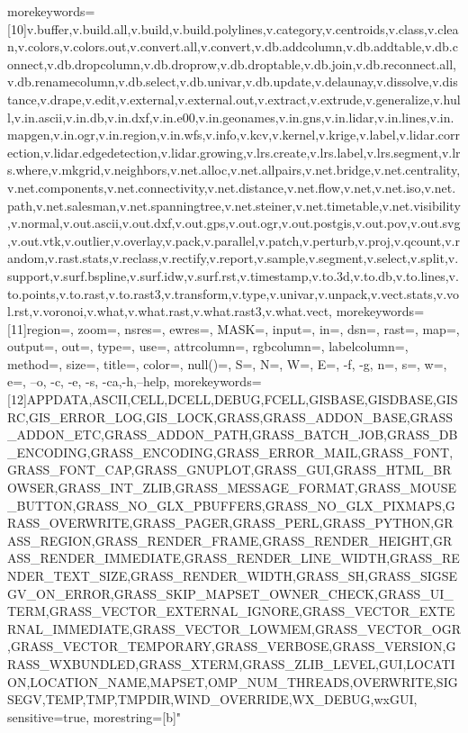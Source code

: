 {%
morekeywords=[10]{v.buffer,v.build.all,v.build,v.build.polylines,v.category,v.centroids,v.class,v.clean,v.colors,v.colors.out,v.convert.all,v.convert,v.db.addcolumn,v.db.addtable,v.db.connect,v.db.dropcolumn,v.db.droprow,v.db.droptable,v.db.join,v.db.reconnect.all,v.db.renamecolumn,v.db.select,v.db.univar,v.db.update,v.delaunay,v.dissolve,v.distance,v.drape,v.edit,v.external,v.external.out,v.extract,v.extrude,v.generalize,v.hull,v.in.ascii,v.in.db,v.in.dxf,v.in.e00,v.in.geonames,v.in.gns,v.in.lidar,v.in.lines,v.in.mapgen,v.in.ogr,v.in.region,v.in.wfs,v.info,v.kcv,v.kernel,v.krige,v.label,v.lidar.correction,v.lidar.edgedetection,v.lidar.growing,v.lrs.create,v.lrs.label,v.lrs.segment,v.lrs.where,v.mkgrid,v.neighbors,v.net.alloc,v.net.allpairs,v.net.bridge,v.net.centrality,v.net.components,v.net.connectivity,v.net.distance,v.net.flow,v.net,v.net.iso,v.net.path,v.net.salesman,v.net.spanningtree,v.net.steiner,v.net.timetable,v.net.visibility,v.normal,v.out.ascii,v.out.dxf,v.out.gps,v.out.ogr,v.out.postgis,v.out.pov,v.out.svg,v.out.vtk,v.outlier,v.overlay,v.pack,v.parallel,v.patch,v.perturb,v.proj,v.qcount,v.random,v.rast.stats,v.reclass,v.rectify,v.report,v.sample,v.segment,v.select,v.split,v.support,v.surf.bspline,v.surf.idw,v.surf.rst,v.timestamp,v.to.3d,v.to.db,v.to.lines,v.to.points,v.to.rast,v.to.rast3,v.transform,v.type,v.univar,v.unpack,v.vect.stats,v.vol.rst,v.voronoi,v.what,v.what.rast,v.what.rast3,v.what.vect},
morekeywords=[11]{region=, zoom=, nsres=, ewres=, MASK=, input=, in=, dsn=, rast=, map=, output=, out=, type=, use=, attrcolumn=, rgbcolumn=, labelcolumn=, method=, size=, title=, color=, null()=, S=, N=, W=, E=, -f, -g, n=, 
s=, w=, e=, --o, -c, -e, -s, -ca,-h,--help},
morekeywords=[12]{APPDATA,ASCII,CELL,DCELL,DEBUG,FCELL,GISBASE,GISDBASE,GISRC,GIS_ERROR_LOG,GIS_LOCK,GRASS,GRASS_ADDON_BASE,GRASS_ADDON_ETC,GRASS_ADDON_PATH,GRASS_BATCH_JOB,GRASS_DB_ENCODING,GRASS_ENCODING,GRASS_ERROR_MAIL,GRASS_FONT,GRASS_FONT_CAP,GRASS_GNUPLOT,GRASS_GUI,GRASS_HTML_BROWSER,GRASS_INT_ZLIB,GRASS_MESSAGE_FORMAT,GRASS_MOUSE_BUTTON,GRASS_NO_GLX_PBUFFERS,GRASS_NO_GLX_PIXMAPS,GRASS_OVERWRITE,GRASS_PAGER,GRASS_PERL,GRASS_PYTHON,GRASS_REGION,GRASS_RENDER_FRAME,GRASS_RENDER_HEIGHT,GRASS_RENDER_IMMEDIATE,GRASS_RENDER_LINE_WIDTH,GRASS_RENDER_TEXT_SIZE,GRASS_RENDER_WIDTH,GRASS_SH,GRASS_SIGSEGV_ON_ERROR,GRASS_SKIP_MAPSET_OWNER_CHECK,GRASS_UI_TERM,GRASS_VECTOR_EXTERNAL_IGNORE,GRASS_VECTOR_EXTERNAL_IMMEDIATE,GRASS_VECTOR_LOWMEM,GRASS_VECTOR_OGR,GRASS_VECTOR_TEMPORARY,GRASS_VERBOSE,GRASS_VERSION,GRASS_WXBUNDLED,GRASS_XTERM,GRASS_ZLIB_LEVEL,GUI,LOCATION,LOCATION_NAME,MAPSET,OMP_NUM_THREADS,OVERWRITE,SIGSEGV,TEMP,TMP,TMPDIR,WIND_OVERRIDE,WX_DEBUG,wxGUI},
%
sensitive=true,
morestring=[b]"}
